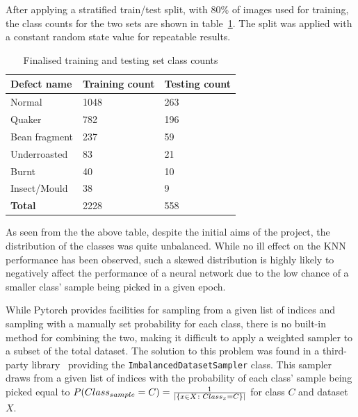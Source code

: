 After applying a stratified train/test split, with 80\% of images used for training, the class counts for the two sets are
shown in table~\ref{tab:finalTrainTestClassCuts}.
The split was applied with a constant random state value for repeatable results.
\begin{table}[h]
    \centering
    \begin{tabular}{lll}
        \toprule
        \textbf{Defect name} & \textbf{Training count} & \textbf{Testing count} \\
        \midrule
        Normal               & 1048                    & 263                    \\
        Quaker               & 782                     & 196                    \\
        Bean fragment        & 237                     & 59                     \\
        Underroasted         & 83                      & 21                     \\
        Burnt                & 40                      & 10                     \\
        Insect/Mould         & 38                      & 9                      \\
        \midrule
        \textbf{Total}       & 2228                    & 558                    \\
        \bottomrule
    \end{tabular}
    \caption{Finalised training and testing set class counts}
    \label{tab:finalTrainTestClassCuts}
\end{table}

As seen from the the above table, despite the initial aims of the project, the distribution of the classes was quite unbalanced.
While no ill effect on the KNN performance has been observed, such a skewed distribution is highly likely to negatively
affect the performance of a neural network due to the low chance of a smaller class' sample being picked in a given epoch.

While Pytorch provides facilities for sampling from a given list of indices and sampling with a manually set probability for each class,
there is no built-in method for combining the two, making it difficult to apply a weighted sampler to a subset of the total dataset.
The solution to this problem was found in a third-party library~\cite{imbalancedSampler} providing the \verb|ImbalancedDatasetSampler| class.
This sampler draws from a given list of indices with the probability of each class' sample being picked equal to
$P(Class_{sample} = C) = \frac{1}{\arrowvert\{x \in X \colon Class_x = C\}\arrowvert}$ for class $C$ and dataset $X$.

